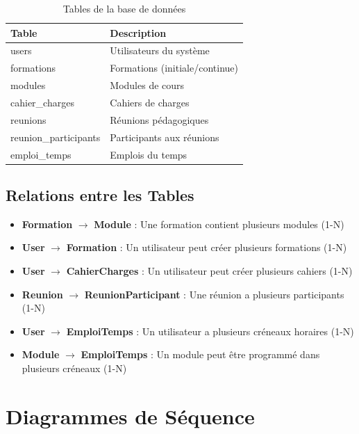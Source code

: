 \documentclass[12pt,a4paper]{report}
\begin{document}
\begin{table}[H]
    \centering
    \begin{tabular}{|l|l|}
        \hline
        \textbf{Table} & \textbf{Description} \\
        \hline
        users & Utilisateurs du système \\
        \hline
        formations & Formations (initiale/continue) \\
        \hline
        modules & Modules de cours \\
        \hline
        cahier\_charges & Cahiers de charges \\
        \hline
        reunions & Réunions pédagogiques \\
        \hline
        reunion\_participants & Participants aux réunions \\
        \hline
        emploi\_temps & Emplois du temps \\
        \hline
    \end{tabular}
    \caption{Tables de la base de données}
    \label{tab:database-tables}
\end{table}

\subsection{Relations entre les Tables}

\begin{itemize}
    \item \textbf{Formation} $\rightarrow$ \textbf{Module} : Une formation contient plusieurs modules (1-N)
    \item \textbf{User} $\rightarrow$ \textbf{Formation} : Un utilisateur peut créer plusieurs formations (1-N)
    \item \textbf{User} $\rightarrow$ \textbf{CahierCharges} : Un utilisateur peut créer plusieurs cahiers (1-N)
    \item \textbf{Reunion} $\rightarrow$ \textbf{ReunionParticipant} : Une réunion a plusieurs participants (1-N)
    \item \textbf{User} $\rightarrow$ \textbf{EmploiTemps} : Un utilisateur a plusieurs créneaux horaires (1-N)
    \item \textbf{Module} $\rightarrow$ \textbf{EmploiTemps} : Un module peut être programmé dans plusieurs créneaux (1-N)
\end{itemize}

\section{Diagrammes de Séquence}
\end{document}
